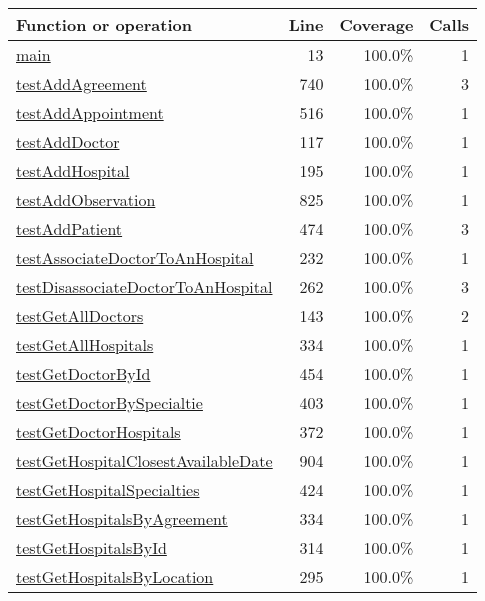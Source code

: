 \bigskip
\begin{longtable}{|l|r|r|r|}
\hline
Function or operation & Line & Coverage & Calls \\
\hline
\hline
\hyperref[main:13]{main} & 13&100.0\% & 1 \\
\hline
\hyperref[testAddAgreement:740]{testAddAgreement} & 740&100.0\% & 3 \\
\hline
\hyperref[testAddAppointment:516]{testAddAppointment} & 516&100.0\% & 1 \\
\hline
\hyperref[testAddDoctor:117]{testAddDoctor} & 117&100.0\% & 1 \\
\hline
\hyperref[testAddHospital:195]{testAddHospital} & 195&100.0\% & 1 \\
\hline
\hyperref[testAddObservation:825]{testAddObservation} & 825&100.0\% & 1 \\
\hline
\hyperref[testAddPatient:474]{testAddPatient} & 474&100.0\% & 3 \\
\hline
\hyperref[testAssociateDoctorToAnHospital:232]{testAssociateDoctorToAnHospital} & 232&100.0\% & 1 \\
\hline
\hyperref[testDisassociateDoctorToAnHospital:262]{testDisassociateDoctorToAnHospital} & 262&100.0\% & 3 \\
\hline
\hyperref[testGetAllDoctors:143]{testGetAllDoctors} & 143&100.0\% & 2 \\
\hline
\hyperref[testGetAllHospitals:334]{testGetAllHospitals} & 334&100.0\% & 1 \\
\hline
\hyperref[testGetDoctorById:454]{testGetDoctorById} & 454&100.0\% & 1 \\
\hline
\hyperref[testGetDoctorBySpecialtie:403]{testGetDoctorBySpecialtie} & 403&100.0\% & 1 \\
\hline
\hyperref[testGetDoctorHospitals:372]{testGetDoctorHospitals} & 372&100.0\% & 1 \\
\hline
\hyperref[testGetHospitalClosestAvailableDate:904]{testGetHospitalClosestAvailableDate} & 904&100.0\% & 1 \\
\hline
\hyperref[testGetHospitalSpecialties:424]{testGetHospitalSpecialties} & 424&100.0\% & 1 \\
\hline
\hyperref[testGetHospitalsByAgreement:334]{testGetHospitalsByAgreement} & 334&100.0\% & 1 \\
\hline
\hyperref[testGetHospitalsById:314]{testGetHospitalsById} & 314&100.0\% & 1 \\
\hline
\hyperref[testGetHospitalsByLocation:295]{testGetHospitalsByLocation} & 295&100.0\% & 1 \\

\end{longtable}
